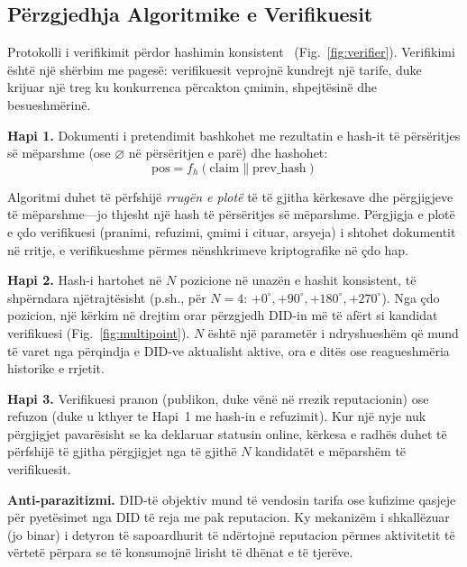 \documentclass[11pt,a4paper,twocolumn]{article}
\begin{document}
\subsection{Përzgjedhja Algoritmike e Verifikuesit}

Protokolli i verifikimit përdor hashimin konsistent~\cite{karger1997} (Fig.~\ref{fig:verifier}). Verifikimi është një shërbim me pagesë: verifikuesit veprojnë kundrejt një tarife, duke krijuar një treg ku konkurrenca përcakton çmimin, shpejtësinë dhe besueshmërinë.

\textbf{Hapi 1.} Dokumenti i pretendimit bashkohet me rezultatin e hash-it të përsëritjes së mëparshme (ose $\varnothing$ në përsëritjen e parë) dhe hashohet:
\begin{equation}
\text{pos} = f_h(\text{claim} \| \text{prev\_hash})
\label{eq:hash}
\end{equation}

Algoritmi duhet të përfshijë \emph{rrugën e plotë} të të gjitha kërkesave dhe përgjigjeve të mëparshme---jo thjesht një hash të përsëritjes së mëparshme. Përgjigja e plotë e çdo verifikuesi (pranimi, refuzimi, çmimi i cituar, arsyeja) i shtohet dokumentit në rritje, e verifikueshme përmes nënshkrimeve kriptografike në çdo hap.

\textbf{Hapi 2.} Hash-i hartohet në $N$ pozicione në unazën e hashit konsistent, të shpërndara njëtrajtësisht (p.sh., për $N=4$: $+0^{\circ}, +90^{\circ}, +180^{\circ}, +270^{\circ}$). Nga çdo pozicion, një kërkim në drejtim orar përzgjedh DID-in më të afërt si kandidat verifikuesi (Fig.~\ref{fig:multipoint}). $N$ është një parametër i ndryshueshëm që mund të varet nga përqindja e DID-ve aktualisht aktive, ora e ditës ose reagueshmëria historike e rrjetit.

\textbf{Hapi 3.} Verifikuesi pranon (publikon, duke vënë në rrezik reputacionin) ose refuzon (duke u kthyer te Hapi~1 me hash-in e refuzimit). Kur një nyje nuk përgjigjet pavarësisht se ka deklaruar statusin online, kërkesa e radhës duhet të përfshijë të gjitha përgjigjet nga të gjithë $N$ kandidatët e mëparshëm të verifikuesit.

\textbf{Anti-parazitizmi.} DID-të objektiv mund të vendosin tarifa ose kufizime qasjeje për pyetësimet nga DID të reja me pak reputacion. Ky mekanizëm i shkallëzuar (jo binar) i detyron të sapoardhurit të ndërtojnë reputacion përmes aktivitetit të vërtetë përpara se të konsumojnë lirisht të dhënat e të tjerëve.
\end{document}
